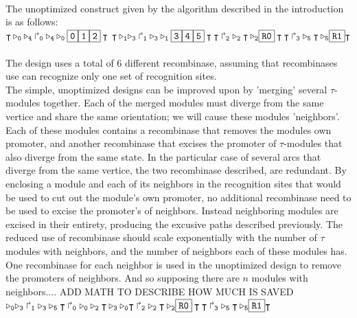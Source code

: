 \documentclass{article}
\newcommand{\prom}[1]{\Rsh_{\tt#1}}
\newcommand{\term}{\intercal}
\newcommand{\rrecsite}[1]{\triangleright_{\tt#1}}
\newcommand{\gene}[1]{\framebox{\tt #1}}
\begin{document}
\\
The unoptimized construct given by the algorithm described in the introduction is as follows: 
\\
$\term \rrecsite{0} \rrecsite{4} \prom{0} \rrecsite{4} \rrecsite{0} \gene{0} \gene{1} \gene{2} \term \\
\term \rrecsite{1} \rrecsite{3} \prom{1} \rrecsite{3} \rrecsite{1} \gene{3} \gene{4} \gene{5} \term \\
\term \prom{2} \rrecsite{2} \term \rrecsite{2} \gene{R0} \term\\
\term \prom{3} \rrecsite{5} \term \rrecsite{5} \gene{R1} \term$\\
\\
The design uses a total of 6 different recombinase, assuming that recombinases use can recognize only one set of recognition sites.
\\
The simple, unoptimized designs can be improved upon by 'merging' several $\tau$-modules together.  Each of the merged modules must diverge from the same vertice and share the same orientation; we will cause these modules 'neighbors'.  Each of these modules contains a recombinase that removes the modules own promoter, and another recombinase that excises the promoter of $\tau$-modules that also diverge from the same state.  In the particular case of several arcs that diverge from the same vertice,  the two recombinase described, are redundant.  By enclosing a module and each of its neighbors in the recognition sites that would be used to cut out the module's own promoter, no additional recombinase need to be used to excise the promoter's of neighbors.  Instead neighboring modules are excised in their entirety, producing the excusive paths described previously.  The reduced use of recombinase should scale exponentially with the number of $\tau$ modules with neighbors, and the number of neighbors each of these modules has.  One recombinase for each neighbor is used in the unoptimized design to remove the promoters of neighbors.  And so supposing there are $n$ modules with neighbors.... ADD MATH TO DESCRIBE HOW MUCH IS SAVED
\\  
$\rrecsite{0} \rrecsite{3} \prom{1} \rrecsite{3} \rrecsite{5} \term \prom{0} \rrecsite{0} \rrecsite{2} \term \rrecsite{3} \rrecsite{0}\\
\term \prom{2} \rrecsite{2} \term \rrecsite{2} \gene{R0} \term \\
\term \prom{3} \rrecsite{5} \term \rrecsite{5} \gene{R1} \term $\\
\\
\end{document}
